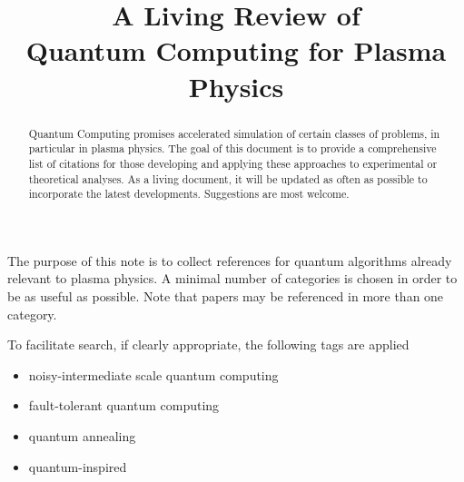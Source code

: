 \documentclass[12pt,letterpaper]{article}
\title{A Living Review of  \\  Quantum Computing for Plasma Physics}
\author{}
\date{}
\let\oldmaketitle\maketitle
\renewcommand\maketitle{{\bfseries\boldmath\oldmaketitle}}
\begin{document}
\maketitle


\begin{abstract}


	Quantum Computing promises accelerated simulation of certain classes of problems, in particular in plasma physics. The goal of this document is to provide a comprehensive list of citations for those developing and applying these approaches to experimental or theoretical analyses.  As a living document, it will be updated as often as possible to incorporate the latest developments.  Suggestions are most welcome.

\end{abstract}

\newpage

The purpose of this note is to collect references for quantum algorithms already relevant to plasma physics.  A minimal number of categories is chosen in order to be as useful as possible. Note that papers may be referenced in more than one category.

To facilitate search, if clearly appropriate, the following tags are applied

 \begin{itemize}

    \item {} noisy-intermediate scale quantum computing

    \item {} fault-tolerant quantum computing

    \item {} quantum annealing

    \item {} quantum-inspired

 \end{itemize}
\end{document}
